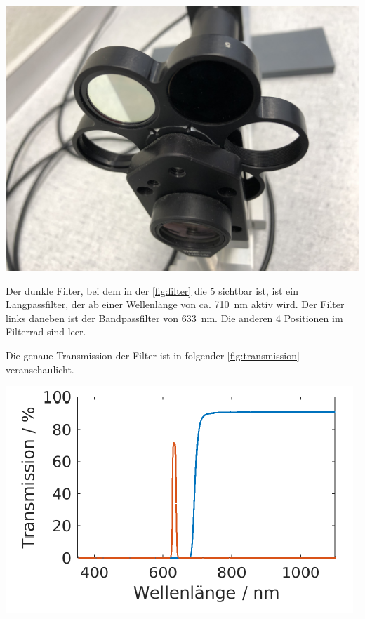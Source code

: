 \documentclass[11pt,ngerman]{scrartcl}
\begin{document}
\begin{center}
	\begin{minipage}[t]{0.7\textwidth}
		\includegraphics[width=\textwidth]{filter}
		\label{fig:filter}
	\end{minipage}
\end{center}

\noindent Der dunkle Filter, bei dem in der \autoref{fig:filter} die 5 sichtbar ist, ist
ein Langpassfilter, der ab einer Wellenlänge von ca. \SI{710}{nm} aktiv wird.
Der Filter links daneben ist der Bandpassfilter von \SI{633}{nm}. Die anderen 4
Positionen im Filterrad sind leer.

\noindent Die genaue Transmission der Filter ist in folgender \autoref{fig:transmission} veranschaulicht.

\begin{center}
	\begin{minipage}[t]{0.5\textwidth}
		\includegraphics[width=\textwidth]{transmission}
		\label{fig:transmission}
	\end{minipage}
\end{center}
\end{document}
